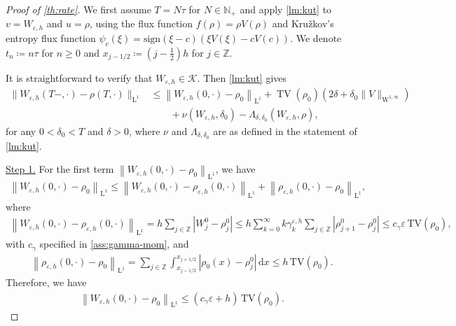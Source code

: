 \documentclass[10pt]{amsart}
\theoremstyle{plain}
\theoremstyle{definition}
\numberwithin{equation}{section}
\newcommand{\N}{\mathbb{N}}
\newcommand{\eps}{{\varepsilon}}
\newcommand{\sgn}[1]{\mathrm{sign}\left(#1\right)}
\newcommand{\dx}{{\, \mathrm{d}x}}
\begin{document}
\begin{proof}[Proof of \cref{th:rate}]
We first assume $T=N\tau$ for $N\in\N_+$ and apply \cref{lm:kut} to $v=W_{\eps,h}$ and $u=\rho$, using the flux function $f(\rho)=\rho V(\rho)$ and Kru\v{z}kov's entropy flux function $\psi_c(\xi)=\sgn{\xi-c}(\xi V(\xi) - cV(c))$. We denote $t_n\coloneqq n\tau$ for $n\geq0$ and $x_{j-1/2}\coloneqq(j-\frac12)h$ for $j\in\mathbb{Z}$.

It is straightforward to verify that $W_{\eps,h}\in\mathcal{K}$. Then \cref{lm:kut} gives
\begin{align*}
\|W_{\eps,h}(T-,\cdot)-\rho(T,\cdot)\|_{\mathrm{L}^1} &\leq \left\|W_{\eps,h}(0,\cdot)-\rho_0\right\|_{\mathrm{L}^1}+\operatorname{TV}\left(\rho_0\right)\left(2 \delta+\delta_0\|V\|_{\mathrm{W}^{1,\infty}}\right) \\
&\qquad +\nu\left(W_{\eps,h}, \delta_0\right)-\Lambda_{\delta, \delta_0}(W_{\eps,h}, \rho),
\end{align*}
for any $0<\delta_0<T$ and $\delta>0$, where $\nu$ and $\Lambda_{\delta, \delta_0}$ are as defined in the statement of \cref{lm:kut}.

\uline{Step 1.} For the first term $\left\|W_{\eps,h}(0,\cdot)-\rho_0\right\|_{\mathrm{L}^1}$, we have
\begin{align*}
    \left\|W_{\eps,h}(0,\cdot)-\rho_0\right\|_{\mathrm{L}^1} \leq \left\|W_{\eps,h}(0,\cdot)-\rho_{\eps,h}(0,\cdot)\right\|_{\mathrm{L}^1} + \left\|\rho_{\eps,h}(0,\cdot)-\rho_0\right\|_{\mathrm{L}^1},
\end{align*}
where
\begin{align*}
    \left\|W_{\eps,h}(0,\cdot)-\rho_{\eps,h}(0,\cdot)\right\|_{\mathrm{L}^1} = h\sum_{j\in\mathbb{Z}} |W_j^0-\rho_j^0| \leq h \sum_{k=0}^\infty k\gamma_k^{\eps,h}\sum_{j\in\mathbb{Z}} |\rho_{j+1}^0-\rho_j^0| \leq c_\gamma\eps \, \mathrm{TV}(\rho_0),
\end{align*}
with $c_\gamma$ specified in \cref{ass:gamma-mom}, and
\begin{align*}
    \left\|\rho_{\eps,h}(0,\cdot)-\rho_0\right\|_{\mathrm{L}^1} = \sum_{j\in\mathbb{Z}} \int_{x_{j-1/2}}^{x_{j+1/2}} |\rho_0(x)-\rho_j^0|\dx \leq h \, \mathrm{TV}(\rho_0).
\end{align*}
Therefore, we have
\begin{align*}
    \left\|W_{\eps,h}(0,\cdot)-\rho_0\right\|_{\mathrm{L}^1} \leq (c_\gamma\eps+h)\, \mathrm{TV}(\rho_0).
\end{align*}


\end{proof}
\end{document}
